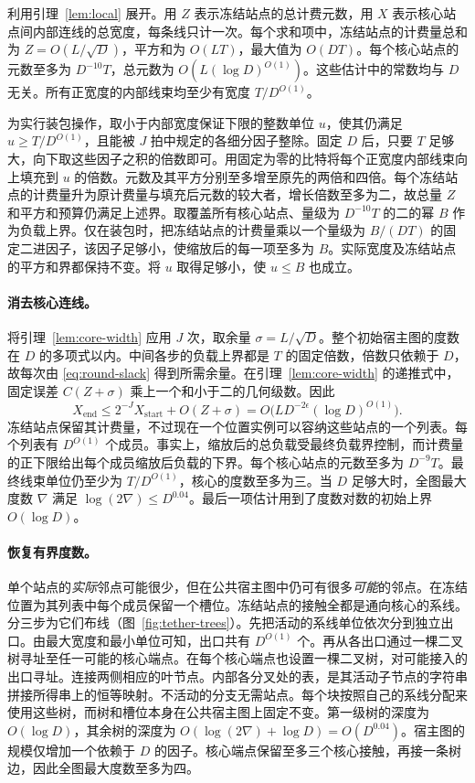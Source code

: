 利用引理~\ref{lem:local} 展开。用 $Z$ 表示冻结站点的总计费元数，用 $X$ 表示核心站点间内部连线的总宽度，每条线只计一次。每个求和项中，冻结站点的计费量总和为 $Z=O(L/\sqrt D)$，平方和为 $O(LT)$，最大值为 $O(DT)$。每个核心站点的元数至多为 $D^{-10}T$，总元数为 $O(L(\log D)^{O(1)})$。这些估计中的常数均与 $D$ 无关。所有正宽度的内部线束均至少有宽度 $T/D^{O(1)}$。

为实行装包操作，取小于内部宽度保证下限的整数单位 $u$，使其仍满足 $u\ge T/D^{O(1)}$，且能被 $J$ 拍中规定的各细分因子整除。固定 $D$ 后，只要 $T$ 足够大，向下取这些因子之积的倍数即可。用固定为零的比特将每个正宽度内部线束向上填充到 $u$ 的倍数。元数及其平方分别至多增至原先的两倍和四倍。每个冻结站点的计费量升为原计费量与填充后元数的较大者，增长倍数至多为二，故总量 $Z$ 和平方和预算仍满足上述界。取覆盖所有核心站点、量级为 $D^{-10}T$ 的二的幂 $B$ 作为负载上界。仅在装包时，把冻结站点的计费量乘以一个量级为 $B/(DT)$ 的固定二进因子，该因子足够小，使缩放后的每一项至多为 $B$。实际宽度及冻结站点的平方和界都保持不变。将 $u$ 取得足够小，使 $u\le B$ 也成立。

\paragraph{消去核心连线。} 将引理~\ref{lem:core-width} 应用 $J$ 次，取余量 $\sigma=L/\sqrt D$。整个初始宿主图的度数在 $D$ 的多项式以内。中间各步的负载上界都是 $T$ 的固定倍数，倍数只依赖于 $D$，故每次由 \eqref{eq:round-slack} 得到所需余量。在引理~\ref{lem:core-width} 的递推式中，固定误差 $C(Z+\sigma)$ 乘上一个和小于二的几何级数。因此 \[
 X_{\mathrm{end}}\le 2^{-J}X_{\mathrm{start}}+O(Z+\sigma)
      = O\bigl(LD^{-2\epsilon}(\log D)^{O(1)}\bigr).
\] 冻结站点保留其计费量，不过现在一个位置实例可以容纳这些站点的一个列表。每个列表有 $D^{O(1)}$ 个成员。事实上，缩放后的总负载受最终负载界控制，而计费量的正下限给出每个成员缩放后负载的下界。每个核心站点的元数至多为 $D^{-9}T$。最终线束单位仍至少为 $T/D^{O(1)}$，核心的度数至多为三。当 $D$ 足够大时，全图最大度数 $\nabla$ 满足 $\log(2\nabla)\le D^{0.04}$。最后一项估计用到了度数对数的初始上界 $O(\log D)$。

\paragraph{恢复有界度数。} 单个站点的\emph{实际}邻点可能很少，但在公共宿主图中仍可有很多\emph{可能}的邻点。在冻结位置为其列表中每个成员保留一个槽位。冻结站点的接触全都是通向核心的系线。分三步为它们布线（图~\ref{fig:tether-trees}）。先把活动的系线单位依次分到独立出口。由最大宽度和最小单位可知，出口共有 $D^{O(1)}$ 个。再从各出口通过一棵二叉树寻址至任一可能的核心端点。在每个核心端点也设置一棵二叉树，对可能接入的出口寻址。连接两侧相应的叶节点。内部各分叉处的表，是其活动子节点的字符串拼接所得串上的恒等映射。不活动的分支无需站点。每个块按照自己的系线分配来使用这些树，而树和槽位本身在公共宿主图上固定不变。第一级树的深度为 $O(\log D)$，其余树的深度为 $O(\log(2\nabla)+\log D)=O(D^{0.04})$。宿主图的规模仅增加一个依赖于 $D$ 的因子。核心端点保留至多三个核心接触，再接一条树边，因此全图最大度数至多为四。


